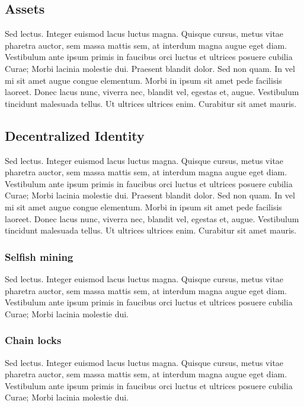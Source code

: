\documentclass[peerreview]{ieeesyscoin}
\begin{document}
\subsection{Assets}
Sed lectus. Integer euismod lacus luctus magna. Quisque cursus, metus vitae pharetra auctor, sem massa mattis sem, at interdum magna augue eget diam. Vestibulum ante ipsum primis in faucibus orci luctus et ultrices posuere cubilia Curae; Morbi lacinia molestie dui. Praesent blandit dolor. Sed non quam. In vel mi sit amet augue congue elementum. Morbi in ipsum sit amet pede facilisis laoreet. Donec lacus nunc, viverra nec, blandit vel, egestas et, augue. Vestibulum tincidunt malesuada tellus. Ut ultrices ultrices enim. Curabitur sit amet mauris. 

\subsection{Decentralized Identity}
Sed lectus. Integer euismod lacus luctus magna. Quisque cursus, metus vitae pharetra auctor, sem massa mattis sem, at interdum magna augue eget diam. Vestibulum ante ipsum primis in faucibus orci luctus et ultrices posuere cubilia Curae; Morbi lacinia molestie dui. Praesent blandit dolor. Sed non quam. In vel mi sit amet augue congue elementum. Morbi in ipsum sit amet pede facilisis laoreet. Donec lacus nunc, viverra nec, blandit vel, egestas et, augue. Vestibulum tincidunt malesuada tellus. Ut ultrices ultrices enim. Curabitur sit amet mauris. 

\subsubsection{Selfish mining}

Sed lectus. Integer euismod lacus luctus magna. Quisque cursus, metus vitae pharetra auctor, sem massa mattis sem, at interdum magna augue eget diam. Vestibulum ante ipsum primis in faucibus orci luctus et ultrices posuere cubilia Curae; Morbi lacinia molestie dui. 

\subsubsection{Chain locks}

Sed lectus. Integer euismod lacus luctus magna. Quisque cursus, metus vitae pharetra auctor, sem massa mattis sem, at interdum magna augue eget diam. Vestibulum ante ipsum primis in faucibus orci luctus et ultrices posuere cubilia Curae; Morbi lacinia molestie dui. 
\end{document}
